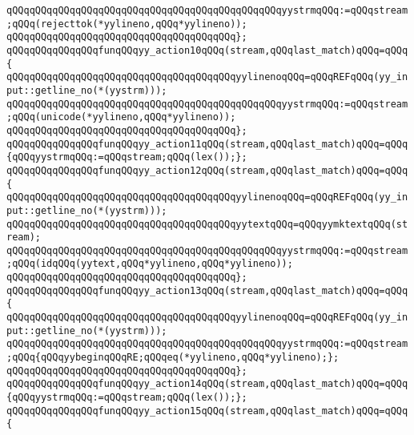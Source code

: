 \newline
\verb|qQQqqQQqqQQqqQQqqQQqqQQqqQQqqQQqqQQqqQQqqQQqqQQqyystrmqQQq:=qQQqstream;qQQq(rejecttok(*yylineno,qQQq*yylineno));|\newline
\verb|qQQqqQQqqQQqqQQqqQQqqQQqqQQqqQQqqQQqqQQq};|\newline
\verb|qQQqqQQqqQQqqQQqfunqQQqyy_action10qQQq(stream,qQQqlast_match)qQQq=qQQq{|\newline
\verb|qQQqqQQqqQQqqQQqqQQqqQQqqQQqqQQqqQQqqQQqyylinenoqQQq=qQQqREFqQQq(yy_input::getline_no(*(yystrm)));|\newline
\newline
\verb|qQQqqQQqqQQqqQQqqQQqqQQqqQQqqQQqqQQqqQQqqQQqqQQqyystrmqQQq:=qQQqstream;qQQq(unicode(*yylineno,qQQq*yylineno));|\newline
\verb|qQQqqQQqqQQqqQQqqQQqqQQqqQQqqQQqqQQqqQQq};|\newline
\verb|qQQqqQQqqQQqqQQqfunqQQqyy_action11qQQq(stream,qQQqlast_match)qQQq=qQQq{qQQqyystrmqQQq:=qQQqstream;qQQq(lex());};|\newline
\verb|qQQqqQQqqQQqqQQqfunqQQqyy_action12qQQq(stream,qQQqlast_match)qQQq=qQQq{|\newline
\verb|qQQqqQQqqQQqqQQqqQQqqQQqqQQqqQQqqQQqqQQqyylinenoqQQq=qQQqREFqQQq(yy_input::getline_no(*(yystrm)));|\newline
\verb|qQQqqQQqqQQqqQQqqQQqqQQqqQQqqQQqqQQqqQQqyytextqQQq=qQQqyymktextqQQq(stream);|\newline
\newline
\verb|qQQqqQQqqQQqqQQqqQQqqQQqqQQqqQQqqQQqqQQqqQQqqQQqyystrmqQQq:=qQQqstream;qQQq(idqQQq(yytext,qQQq*yylineno,qQQq*yylineno));|\newline
\verb|qQQqqQQqqQQqqQQqqQQqqQQqqQQqqQQqqQQqqQQq};|\newline
\verb|qQQqqQQqqQQqqQQqfunqQQqyy_action13qQQq(stream,qQQqlast_match)qQQq=qQQq{|\newline
\verb|qQQqqQQqqQQqqQQqqQQqqQQqqQQqqQQqqQQqqQQqyylinenoqQQq=qQQqREFqQQq(yy_input::getline_no(*(yystrm)));|\newline
\newline
\verb|qQQqqQQqqQQqqQQqqQQqqQQqqQQqqQQqqQQqqQQqqQQqqQQqyystrmqQQq:=qQQqstream;qQQq{qQQqyybeginqQQqRE;qQQqeq(*yylineno,qQQq*yylineno);};|\newline
\verb|qQQqqQQqqQQqqQQqqQQqqQQqqQQqqQQqqQQqqQQq};|\newline
\verb|qQQqqQQqqQQqqQQqfunqQQqyy_action14qQQq(stream,qQQqlast_match)qQQq=qQQq{qQQqyystrmqQQq:=qQQqstream;qQQq(lex());};|\newline
\verb|qQQqqQQqqQQqqQQqfunqQQqyy_action15qQQq(stream,qQQqlast_match)qQQq=qQQq{|\newline
